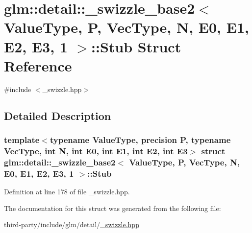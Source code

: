 \hypertarget{structglm_1_1detail_1_1__swizzle__base2_3_01_value_type_00_01_p_00_01_vec_type_00_01_n_00_01_e0_17279995be88bc842083eed40758473c}{}\section{glm\+:\+:detail\+:\+:\+\_\+swizzle\+\_\+base2$<$ Value\+Type, P, Vec\+Type, N, E0, E1, E2, E3, 1 $>$\+:\+:Stub Struct Reference}
\label{structglm_1_1detail_1_1__swizzle__base2_3_01_value_type_00_01_p_00_01_vec_type_00_01_n_00_01_e0_17279995be88bc842083eed40758473c}


{\ttfamily \#include $<$\+\_\+swizzle.\+hpp$>$}



\subsection{Detailed Description}
\subsubsection*{template$<$typename Value\+Type, precision P, typename Vec\+Type, int N, int E0, int E1, int E2, int E3$>$\newline
struct glm\+::detail\+::\+\_\+swizzle\+\_\+base2$<$ Value\+Type, P, Vec\+Type, N, E0, E1, E2, E3, 1 $>$\+::\+Stub}



Definition at line 178 of file \+\_\+swizzle.\+hpp.



The documentation for this struct was generated from the following file\+:\begin{DoxyCompactItemize}
\item 
third-\/party/include/glm/detail/\hyperlink{__swizzle_8hpp}{\+\_\+swizzle.\+hpp}\end{DoxyCompactItemize}
